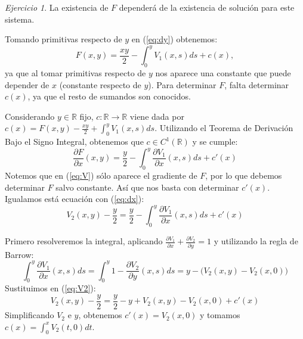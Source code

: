 \documentclass[12pt,spanish]{article}
\theoremstyle{definition}
\theoremstyle{remark}
\newtheorem{exercise}{Ejercicio}
\begin{document}
\begin{exercise}
La existencia de $F$ dependerá de la existencia de solución para este
sistema.

Tomando primitivas respecto de $y$ en (\ref{eq:dy}) obtenemos:
\begin{equation} \label{eq:Fc}
  F(x,y)=\frac{xy}{2}-\int_0^y V_1(x,s)ds+c(x),
\end{equation}
ya que al tomar primitivas respecto de $y$ nos aparece una constante
que puede depender de $x$ (constante respecto de $y$). Para determinar
$F$, falta determinar $c(x)$, ya que el resto de sumandos son
conocidos.

Considerando $y\in\mathbb{R}$ fijo,
$c:\mathbb{R}\rightarrow\mathbb{R}$ viene dada por
$c(x)=F(x,y)-\frac{xy}{2}+\int_0^y V_1(x,s)ds$. Utilizando el Teorema
de Derivación Bajo el Signo Integral, obtenemos que
$c\in C^1(\mathbb{R})$ y se cumple:
\[\frac{\partial F}{\partial x}(x,y)=\frac{y}{2}-\int_0^y
  \frac{\partial V_1}{\partial x}(x,s)ds+c'(x)\] Notemos que en
(\ref{eq:V}) sólo aparece el gradiente de $F$, por lo que debemos
determinar $F$ salvo constante. Así que nos basta con determinar
$c'(x)$. Igualamos está ecuación con (\ref{eq:dx}):
\begin{equation} \label{eq:V2}
  V_2(x,y)-\frac{y}{2}=\frac{y}{2}-\int_0^y
  \frac{\partial V_1}{\partial x}(x,s)ds+c'(x)
\end{equation}

Primero resolveremos la integral, aplicando
$\frac{\partial V_1}{\partial x}+\frac{\partial V_2}{\partial y}=1$ y
utilizando la regla de Barrow:
\begin{equation} \label{eq:int}
  \int_0^y \frac{\partial V_1}{\partial x}(x,s)ds=\int_0^y
  1-\frac{\partial V_2}{\partial y}(x,s)ds=y-\big(V_2(x,y)-V_2(x,0)\big)
\end{equation}
Sustituimos en (\ref{eq:V2}):
\begin{equation} \label{eq:c'}
  V_2(x,y)-\frac{y}{2}=\frac{y}{2}-y+V_2(x,y)-V_2(x,0)+c'(x)
\end{equation}
Simplificando $V_2$ e $y$, obtenemos $c'(x)=V_2(x,0)$ y tomamos
$c(x)=\int_0^x V_2(t,0)dt$.


\end{exercise}
\end{document}
